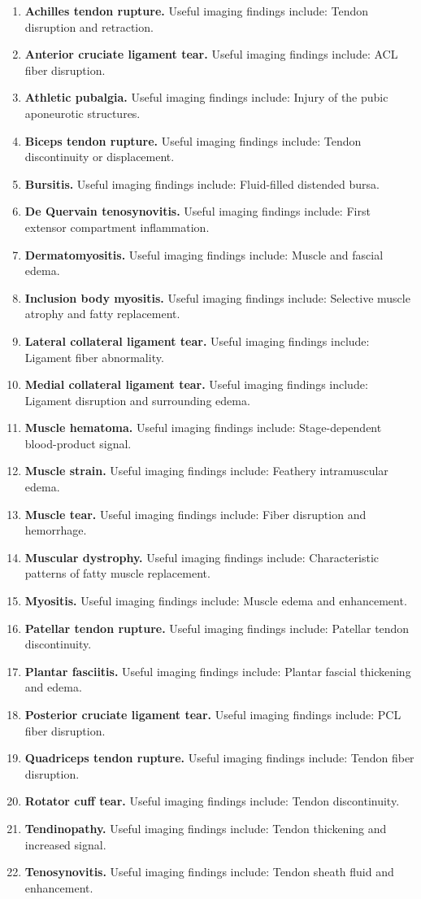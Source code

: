 \begin{enumerate}[leftmargin=*,itemsep=0.45em,topsep=0.4em]
\item \textbf{Achilles tendon rupture.} Useful imaging findings include: Tendon disruption and retraction.
\item \textbf{Anterior cruciate ligament tear.} Useful imaging findings include: ACL fiber disruption.
\item \textbf{Athletic pubalgia.} Useful imaging findings include: Injury of the pubic aponeurotic structures.
\item \textbf{Biceps tendon rupture.} Useful imaging findings include: Tendon discontinuity or displacement.
\item \textbf{Bursitis.} Useful imaging findings include: Fluid-filled distended bursa.
\item \textbf{De Quervain tenosynovitis.} Useful imaging findings include: First extensor compartment inflammation.
\item \textbf{Dermatomyositis.} Useful imaging findings include: Muscle and fascial edema.
\item \textbf{Inclusion body myositis.} Useful imaging findings include: Selective muscle atrophy and fatty replacement.
\item \textbf{Lateral collateral ligament tear.} Useful imaging findings include: Ligament fiber abnormality.
\item \textbf{Medial collateral ligament tear.} Useful imaging findings include: Ligament disruption and surrounding edema.
\item \textbf{Muscle hematoma.} Useful imaging findings include: Stage-dependent blood-product signal.
\item \textbf{Muscle strain.} Useful imaging findings include: Feathery intramuscular edema.
\item \textbf{Muscle tear.} Useful imaging findings include: Fiber disruption and hemorrhage.
\item \textbf{Muscular dystrophy.} Useful imaging findings include: Characteristic patterns of fatty muscle replacement.
\item \textbf{Myositis.} Useful imaging findings include: Muscle edema and enhancement.
\item \textbf{Patellar tendon rupture.} Useful imaging findings include: Patellar tendon discontinuity.
\item \textbf{Plantar fasciitis.} Useful imaging findings include: Plantar fascial thickening and edema.
\item \textbf{Posterior cruciate ligament tear.} Useful imaging findings include: PCL fiber disruption.
\item \textbf{Quadriceps tendon rupture.} Useful imaging findings include: Tendon fiber disruption.
\item \textbf{Rotator cuff tear.} Useful imaging findings include: Tendon discontinuity.
\item \textbf{Tendinopathy.} Useful imaging findings include: Tendon thickening and increased signal.
\item \textbf{Tenosynovitis.} Useful imaging findings include: Tendon sheath fluid and enhancement.
\end{enumerate}

